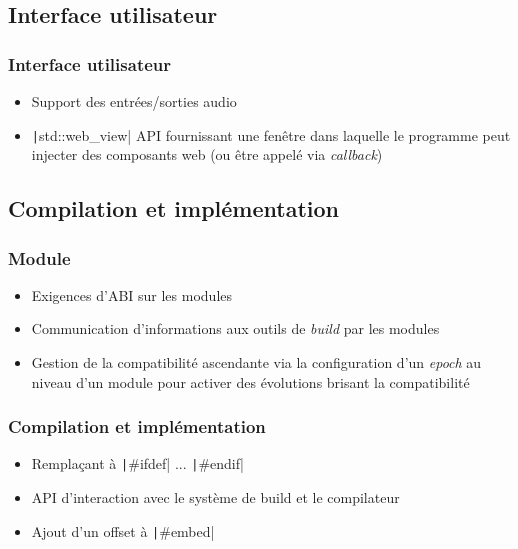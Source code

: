 \documentclass[C++.tex]{subfiles}
\begin{document}
\subsection*{Interface utilisateur}
\begin{frame}[fragile]
	\frametitle{Interface utilisateur}
	\begin{itemize}
		\item Support des entrées/sorties audio
		\item \texttt|std::web_view| API fournissant une fenêtre dans laquelle le programme peut injecter des composants web (ou être appelé via \textit{callback})
	\end{itemize}
\end{frame}

\subsection*{Compilation et implémentation}
\begin{frame}[fragile]
	\frametitle{Module}
	\begin{itemize}
		\item Exigences d'ABI sur les modules
		\item Communication d'informations aux outils de \textit{build} par les modules
		\item Gestion de la compatibilité ascendante via la configuration d'un \textit{epoch} au niveau d'un module pour activer des évolutions brisant la compatibilité
	\end{itemize}

\end{frame}

\begin{frame}[fragile]
	\frametitle{Compilation et implémentation}
	\begin{itemize}
		\item Remplaçant à \texttt|#ifdef| ... \texttt|#endif|
		\item API d'interaction avec le système de build et le compilateur
		\item Ajout d'un offset à \texttt|#embed|
	\end{itemize}

\end{frame}
\end{document}
